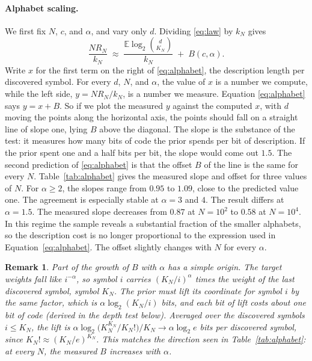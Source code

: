 \documentclass[11pt]{article}
\newcommand{\E}{\mathbb{E}}
\newtheorem{remark}{Remark}
\begin{document}
\paragraph{Alphabet scaling.}
We first fix $N$, $c$, and $\alpha$, and vary only $d$. Dividing
\eqref{eq:law} by $k_N$ gives
\begin{equation}
\frac{N R_N}{k_N} \;\approx\;
\frac{\E\log_2\binom{d}{K_N}}{k_N} \;+\; B(c,\alpha).
\label{eq:alphabet}
\end{equation}
Write $x$ for the first term on the right of
\eqref{eq:alphabet}, the description length per discovered symbol.
For every $d$, $N$, and $\alpha$, the value of $x$ is a number we
compute, while the left side, $y = N R_N / k_N$, is a number we
measure. Equation \eqref{eq:alphabet} says $y = x + B$. So if we
plot the measured $y$ against the computed $x$, with $d$ moving the
points along the horizontal axis, the points should fall on a
straight line of slope one, lying $B$ above the diagonal. The slope is
the substance of the test: it measures how many bits of code the prior
spends per bit of description. If the prior spent one and a half bits
per bit, the slope would come out $1.5$. The second prediction of
\eqref{eq:alphabet} is that the offset $B$ of the line is the same
for every $N$.
Table~\ref{tab:alphabet} gives the measured slope and offset for three
values of \(N\). For \(\alpha\geq2\), the slopes range from \(0.95\) to
\(1.09\), close to the predicted value one. The agreement is especially
stable at \(\alpha=3\) and \(4\).
The result differs at \(\alpha=1.5\). The measured slope decreases from
\(0.87\) at \(N=10^2\) to \(0.58\) at \(N=10^4\). In this regime the sample
reveals a substantial fraction of the smaller alphabets, so the description
cost is no longer proportional to the expression used in
Equation~\eqref{eq:alphabet}.
The offset slightly changes with \(N\) for every \(\alpha\).
\begin{remark} \label{rem:alpha-part} Part of the growth of $B$ with $\alpha$ has a
simple origin. The target weights fall like $i^{-\alpha}$, so
symbol $i$ carries $(K_N/i)^{\alpha}$ times the weight of the last
discovered symbol, symbol $K_N$. The prior must lift its
coordinate for symbol $i$ by the same factor, which is
$\alpha \log_2 (K_N/i)$ bits, and each bit of lift costs about one
bit of code (derived in the depth test below). Averaged over the
discovered symbols $i \le K_N$, the lift is
$\alpha \log_2\!\bigl(K_N^{K_N}/K_N!\bigr)/K_N
\to \alpha \log_2 e$ bits per discovered symbol, since
$K_N! \approx (K_N/e)^{K_N}$. This matches the direction seen in
Table~\ref{tab:alphabet}: at every $N$, the measured $B$ increases
with $\alpha$.
\end{remark}
\end{document}

